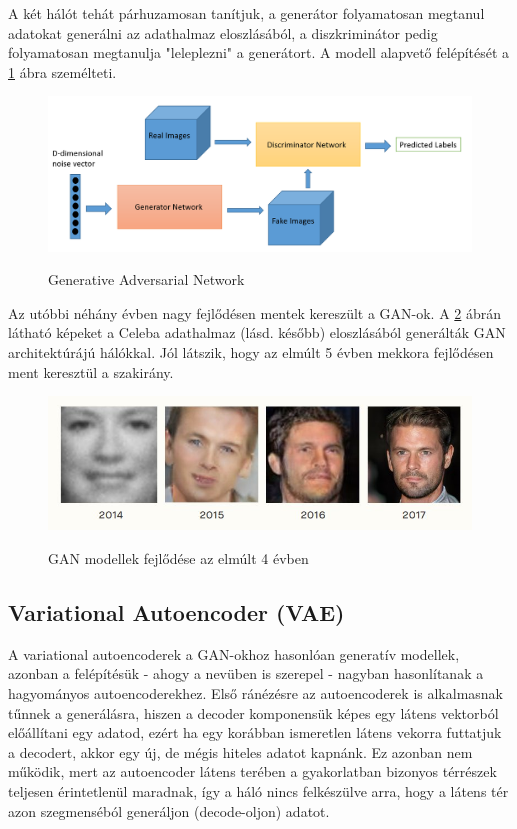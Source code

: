\documentclass[12pt]{article}
\begin{document}
A két hálót tehát párhuzamosan tanítjuk, a generátor folyamatosan megtanul adatokat generálni az adathalmaz eloszlásából, a diszkriminátor pedig folyamatosan megtanulja "leleplezni" a generátort. A modell alapvető felépítését a \ref{gan} ábra személteti.

\begin{figure}[h!]
\begin{center}
  \label{gan}
  \includegraphics[width=\linewidth]{gan.png}
  \caption{Generative Adversarial Network}
\end{center}
\end{figure}

Az utóbbi néhány évben nagy fejlődésen mentek kereszült a GAN-ok. A \ref{gan_progress} ábrán látható képeket a Celeba adathalmaz (lásd. később) eloszlásából generálták GAN architektúrájú hálókkal. Jól látszik, hogy az elmúlt 5 évben mekkora fejlődésen ment keresztül a szakirány. 

\begin{figure}[h!]
\begin{center}
  \label{gan_progress}
  \includegraphics[width=\linewidth]{gan_progress.jpg}
  \caption{GAN modellek fejlődése az elmúlt 4 évben}
\end{center}
\end{figure}

\subsection{Variational Autoencoder (VAE)}

A variational autoencoderek a GAN-okhoz hasonlóan generatív modellek, azonban a felépítésük - ahogy a nevüben is szerepel -  nagyban hasonlítanak a hagyományos autoencoderekhez.
Első ránézésre az autoencoderek is alkalmasnak tűnnek a generálásra, hiszen a decoder komponensük képes egy látens vektorból előállítani egy adatod, ezért ha egy korábban ismeretlen látens vekorra futtatjuk a decodert, akkor egy új, de mégis hiteles adatot kapnánk. Ez azonban nem működik, mert az autoencoder látens terében a gyakorlatban bizonyos térrészek teljesen érintetlenül maradnak, így a háló nincs felkészülve arra, hogy a látens tér azon szegmenséból generáljon (decode-oljon) adatot.
\end{document}
